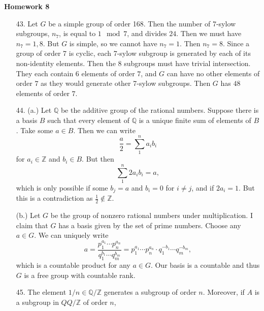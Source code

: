 \documentclass[11pt, reqno]{article}
\theoremstyle{plain}
\theoremstyle{definition}
\theoremstyle{remark}
\newcommand{\ZZ}{\mathbb{Z}}
\newcommand{\QQ}{\mathbb{Q}}
\begin{document}
\topmargin=-40pt
\renewcommand{\headrulewidth}{1pt}
\renewcommand{\headsep}{20pt}
\thispagestyle{fancy}

{\Huge \bfseries \noindent Homework 8}

\begin{enumerate}
    \item[43.] Let $G$ be a simple group of order 168. Then the number of 7-sylow subgroups, $n_7$,
    is equal to $1 \mod 7$, and divides $24$. Then we must have $n_7 = 1, 8$. But $G$ is simple,
    so we cannot have $n_7 = 1$. Then $n_7 = 8$. Since a group of order 7 is cyclic, each 7-sylow
    subgroup is generated by each of its non-identity elements. Then the 8 subgroups must have trivial
    intersection. They each contain $6$ elements of order $7$, and $G$ can have no other 
    elements of order $7$ as they would generate other 7-sylow subgroups. Then $G$ has 
    $48$ elements of order $7$.

    \item[44.] (a.) Let $\QQ$ be the additive group of the rational numbers. Suppose there is 
    a basis $B$ such that every element of $\QQ$ is a unique finite sum of elements of $B$. Take
    some $a \in B$. Then we can write
    \[
        \frac{a}{2} = \sum_1^n a_i b_i
    \]
    for $a_i \in \ZZ$ and $b_i \in B$. But then 
    \[
        \sum_1^n 2a_i b_i = a,
    \]
    which is only possible if some $b_j = a$ and $b_i = 0$ for $i \neq j$, and if $2a_i = 1$. But
    this is a contradiction as $\frac{1}{2} \notin \ZZ$. 

    (b.) Let $G$ be the group of nonzero rational numbers under multiplication. I claim that $G$
    has a basis given by the set of prime numbers. Choose any $a \in G$. We can uniquely write
    \[
        a = \frac{p_1^{a_1}\cdots p_n^{a_n}}{q_1^{b_1}\cdots q_m^{b_m}} = 
        p_1^{a_1}\cdots p_n^{a_n}\cdot q_1^{-b_1}\cdots q_m^{-b_m},
    \]
    which is a countable product for any $a \in G$. Our basis is a countable and thus $G$ is a free group 
    with countable rank. 

    \item[45.] The element $1/n \in \QQ/\ZZ$ generates a subgroup of order $n$. Moreover, if $A$ is a 
    subgroup in $QQ/\ZZ$ of order $n$, 

\end{enumerate}
\end{document}
